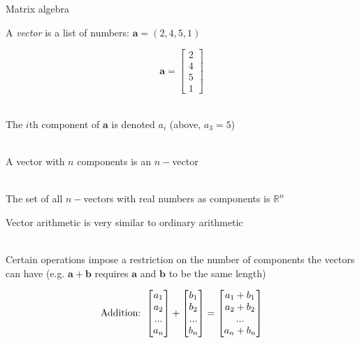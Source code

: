 \documentclass[10pt]{seminar}
\begin{document}
\newtheorem{proposition}{Proposition}

\newtheorem{definition}{Definition}

\newtheorem{corollary}{Corollary}

\newtheorem{theorem}{Theorem}

\newtheorem{lemma}{Lemma}

\def\argmax{\mathop{\rm argmax}\limits}  



\sffamily 


\begin{slide}
\begin{center}

Matrix algebra
 \end{center}
 
 \newslide
 \small 
 
 A \textit{vector} is a list of numbers: $\mathbf{a}=(2, 4, 5, 1)$ 
 
 $$\mathbf{a}= \begin{bmatrix}
  2\\4\\5\\1
\end{bmatrix}$$

\ \\The $i$th component of $\mathbf{a}$ is denoted $a_i$ (above, $a_3=5$)

\ \\A vector with $n$ components is an $n-$vector

\ \\The set of all $n-$vectors with real numbers as components is $\mathbb{R}^n$

\newslide

Vector arithmetic is very similar to ordinary arithmetic

\ \\Certain operations impose a restriction on the number of components the vectors can have (e.g. $\mathbf{a}+\mathbf{b}$ requires $\mathbf{a}$ and $\mathbf{b}$ to be the same length)

$$
\hbox{Addition: }
\begin{bmatrix}
a_1\\a_2\\ ... \\a_n
\end{bmatrix}
+
\begin{bmatrix}
b_1\\b_2\\ ... \\b_n
\end{bmatrix}
=
\begin{bmatrix}
a_1+b_1\\a_2+b_2\\ ... \\a_n+b_n
\end{bmatrix}
$$


\end{slide}
\end{document}
